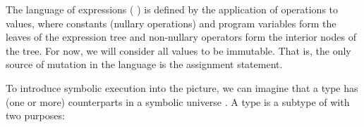 \documentclass{IOS-Book-Article}
\begin{document}
\begin{mdP}[data-line={351}]%
{}The language of expressions (%
{}%
{}) is defined by the application of operations
to values, where constants (nullary operations) and 
program variables form the leaves 
of the expression tree and non-nullary operators 
form the interior nodes of the tree.
For now, we will consider all values to be immutable.
That is, the only source of mutation in the language is the 
assignment statement.%
\end{mdP}%
\begin{mdP}[class={indent,para-continue},data-line={360}]%
{}To introduce symbolic execution into the picture,
we can imagine that a type %
{}%
{} has
(one or more) counterparts in a symbolic universe %
{}%
{}. A type %
{}%
{}
is a subtype of %
{}%
{} with two purposes:%
\end{mdP}%
\end{document}
